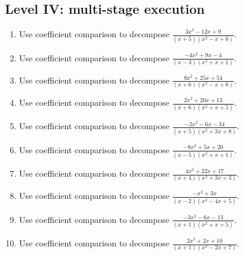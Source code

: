 \documentclass[11pt,oneside]{book}
\begin{document}
\subsection*{Level IV: multi-stage execution}
\begin{enumerate}[leftmargin=*,label=\textbf{\arabic*.},itemsep=0.65\baselineskip]
\item Use coefficient comparison to decompose $\displaystyle \frac{3 x^{2} - 12 x + 9}{\left(x + 5\right) \left(x^{2} - x + 6\right)}$.
\item Use coefficient comparison to decompose $\displaystyle \frac{- 4 x^{2} + 9 x - 4}{\left(x - 3\right) \left(x^{2} + x + 1\right)}$.
\item Use coefficient comparison to decompose $\displaystyle \frac{8 x^{2} + 25 x + 54}{\left(x + 6\right) \left(x^{2} - x + 6\right)}$.
\item Use coefficient comparison to decompose $\displaystyle \frac{2 x^{2} + 20 x + 13}{\left(x + 6\right) \left(x^{2} + x + 5\right)}$.
\item Use coefficient comparison to decompose $\displaystyle \frac{- 2 x^{2} - 6 x - 34}{\left(x + 5\right) \left(x^{2} + 3 x + 8\right)}$.
\item Use coefficient comparison to decompose $\displaystyle \frac{- 8 x^{2} + 5 x + 20}{\left(x - 5\right) \left(x^{2} + x + 1\right)}$.
\item Use coefficient comparison to decompose $\displaystyle \frac{4 x^{2} + 22 x + 17}{\left(x + 4\right) \left(x^{2} + 3 x + 3\right)}$.
\item Use coefficient comparison to decompose $\displaystyle \frac{- x^{2} + 3 x}{\left(x - 2\right) \left(x^{2} - 4 x + 5\right)}$.
\item Use coefficient comparison to decompose $\displaystyle \frac{- 3 x^{2} - 6 x - 13}{\left(x + 1\right) \left(x^{2} + x + 5\right)}$.
\item Use coefficient comparison to decompose $\displaystyle \frac{2 x^{2} + 2 x + 10}{\left(x + 1\right) \left(x^{2} - 2 x + 7\right)}$.
\end{enumerate}
\end{document}
